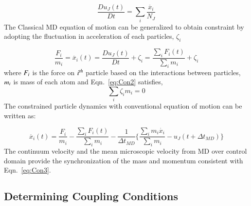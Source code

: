 \documentclass[preprint,12pt]{elsarticle}
\begin{document}
\vspace{-.2em}
\begin{equation}
 \frac{Du_{J}(t)}{Dt} =  \displaystyle\sum_{i} \frac{\ddot{x_{i}}}{N_{J}}
 \label{eq:Lagrangian}
\end{equation}
\normalsize
The Classical MD equation of motion can be generalized to obtain constraint by adopting the fluctuation in acceleration of each particles, $\zeta_{i}$

\vspace{-.2em}
\begin{equation}
 \frac{F_{i}}{m_{i}} = \ddot{x_{i}}(t)  =   \frac{Du_{J}(t)}{Dt} + \zeta_{i} = \frac{\displaystyle\sum_{i}F_{i}(t)} {\displaystyle\sum_{i}m_{i}} +   \zeta_{i}
 \label{eq:Con2}
\end{equation}
\normalsize
where $\it F_{i}$ is the force on $\it i^{th}$ particle based on the interactions between particles,  $\it m_{i}$ is mass of each atom and  Eqn.~\ref{eq:Con2} satisfies,
\vspace{-.2em}
\begin{equation}
\displaystyle\sum_{i}\zeta_{i}m_{i} = 0
 \label{eq:Con2}
\end{equation}
\normalsize
The constrained particle dynamics with conventional equation of motion can be written as:

\vspace{-.2em}
\begin{equation}
 \ddot{x_{i}}(t) = \frac{F_{i}}{m_{i}} -  \frac{\displaystyle\sum_{i}F_{i}(t)} {\displaystyle\sum_{i}m_{i}} - \frac{1}{\Delta t_{MD}} \{  \frac{\displaystyle\sum_{i}m_{i}\dot{x_{i}}} {\displaystyle\sum_{i}m_{i}} - u_{J}(t + \Delta t_{MD})\}
 \label{eq:Con3}
\end{equation}
\normalsize
The continuum velocity and the mean microscopic velocity from MD over control domain provide the synchronization of the mass and momentum consistent with Eqn.~\ref{eq:Con3}.



\subsection{Determining Coupling Conditions}
\end{document}
